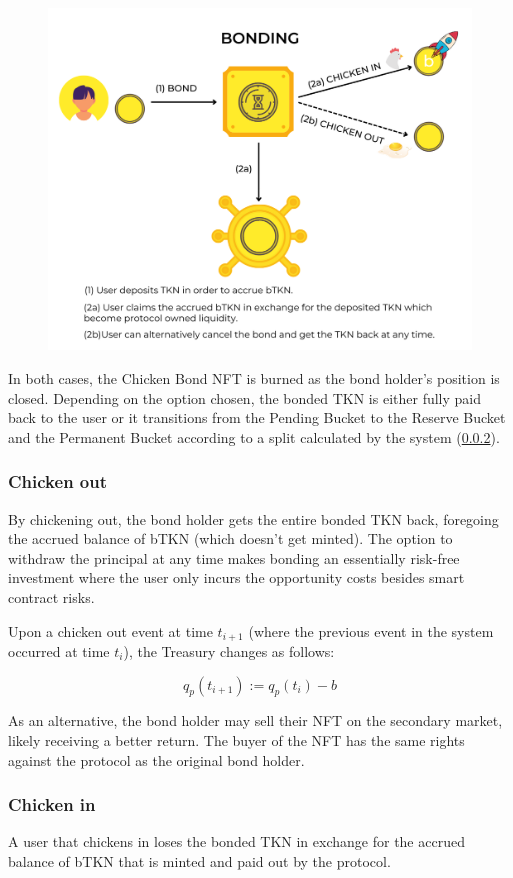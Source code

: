 \documentclass{article}
\begin{document}
\begin{figure}[ht]
    \centering
    \includegraphics[width=0.5\linewidth]{./bonding_text.png}
\end{figure}

In both cases, the Chicken Bond NFT is burned as the bond holder’s position is closed. Depending on the option chosen, the bonded TKN is either fully paid back to the user or it transitions from the Pending Bucket to the Reserve Bucket and the Permanent Bucket according to a split calculated by the system (\ref{sec:chicken-in}). 

\subsubsection{Chicken out}
\label{sec:chicken-out}
By chickening out, the bond holder gets the entire bonded TKN back, foregoing the accrued balance of bTKN (which doesn’t get minted). The option to withdraw the principal at any time makes bonding an essentially risk-free investment where the user only incurs the opportunity costs besides smart contract risks.

Upon a chicken out event at time $t_{i+1}$ (where the previous event in the system occurred at time $t_i$), the Treasury changes as follows:

\begin{equation}
  \label{eq:chicken-out-transition}
    q_p(t_{i+1}) := q_p(t_i) - b
\end{equation}

As an alternative, the bond holder may sell their NFT on the secondary market, likely receiving a better return. The buyer of the NFT has the same rights against the protocol as the original bond holder.

\subsubsection{Chicken in}
\label{sec:chicken-in}
A user that chickens in loses the bonded TKN in exchange for the accrued balance of bTKN that is minted and paid out by the protocol. 
\end{document}
